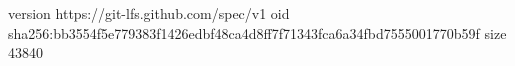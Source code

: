 version https://git-lfs.github.com/spec/v1
oid sha256:bb3554f5e779383f1426edbf48ca4d8ff7f71343fca6a34fbd7555001770b59f
size 43840
